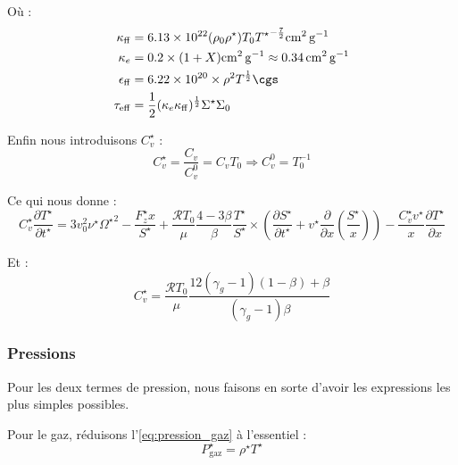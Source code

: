 Où :
\begin{subequations}
    \begin{align}
        \kappa_\mathrm{ff} &= \num{6.13e22} (\rho_0 \rho^\star) {T_0 T^\star}^{-\frac{7}{2}} \si{\square\centi\meter\per\gram} \\
        \kappa_e &= 0.2 \times (1 + X) \si{\square\centi\meter\per\gram} \approx \SI{0.34}{\square\centi\meter\per\gram} \\
        \epsilon_\mathrm{ff} &= \num{6.22e20} \times \rho^2 T^\frac{1}{2} \si{\cgs} \\
        \tau_\mathrm{eff} &= \frac{1}{2} (\kappa_e \kappa_\mathrm{ff})^\frac{1}{2} \Sigma^\star \Sigma_0
    \end{align}
\end{subequations}

Enfin nous introduisons $C_v^\star$ :
\begin{equation}
    C_v^\star = \frac{C_v}{C_v^0} = C_v T_0 \Rightarrow C_v^0 = T_0^{-1}
\end{equation} 

Ce qui nous donne :
\begin{equation}
    C_v^\star \frac{\partial T^{\star}}{\partial t^{\star}} =
    3 v_0^2 \nu^\star {\Omega^\star}^2 - \frac{F_z^\star x}{S^\star} +
    \frac{\mathcal{R} T_0}{\mu} \frac{4-3\beta}{\beta} \frac{T^\star}{S^\star} \times
    \left( \frac{\partial S^\star}{\partial t^\star} + v^\star \frac{\partial}{\partial x} \left(\frac{S^\star}{x}\right) \right) -
    \frac{C_v^\star v^\star}{x} \frac{\partial T^\star}{\partial x}
\end{equation}

Et :
\begin{equation}
    C_v^\star = \frac{\mathcal{R} T_0}{\mu} \frac{12 (\gamma_g - 1)(1 - \beta) + \beta}{(\gamma_g - 1) \beta}
\end{equation}

\subsubsection{Pressions}

Pour les deux termes de pression, nous faisons en sorte d’avoir les expressions
les plus simples possibles.

Pour le gaz, réduisons l’\cref{eq:pression_gaz} à l’essentiel :
\begin{equation}
    P_\mathrm{gaz}^\star = \rho^\star T^\star
\end{equation}

